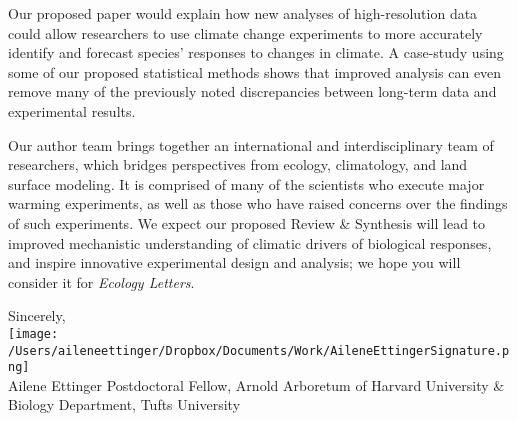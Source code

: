 \documentclass[11pt,a4paper]{letter}
\begin{document}
\begin{letter}{}
Our proposed paper would explain how new analyses of high-resolution data could allow researchers to use climate change experiments to more accurately identify and forecast species' responses to changes in climate. A case-study using some of our proposed statistical methods shows that improved analysis can even remove many of the previously noted discrepancies between long-term data and experimental results. 

Our author team brings together an international and interdisciplinary team of researchers, which bridges perspectives from ecology, climatology, and land surface modeling. It is comprised of many of the scientists who execute major warming experiments, as well as those who have raised concerns over the findings of such experiments.  We expect our proposed Review \& Synthesis will lead to improved mechanistic understanding of climatic drivers of biological responses, and inspire innovative experimental design and analysis; we hope you will consider it for \emph{Ecology Letters}.

Sincerely,\\

\texttt{[image: /Users/aileneettinger/Dropbox/Documents/Work/AileneEttingerSignature.png]} \\
Ailene Ettinger
Postdoctoral Fellow, Arnold Arboretum of Harvard University \& Biology Department, Tufts University


\end{letter}
\end{document}
